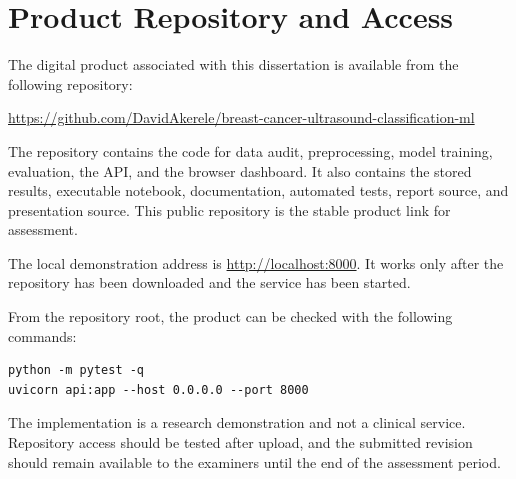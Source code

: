 \chapter{Product Repository and Access}
\label{app:product_repository}

The digital product associated with this dissertation is available from the following repository:

\begin{center}
\large
\url{https://github.com/DavidAkerele/breast-cancer-ultrasound-classification-ml}
\end{center}

The repository contains the code for data audit, preprocessing, model training, evaluation, the API, and the browser dashboard. It also contains the stored results, executable notebook, documentation, automated tests, report source, and presentation source. This public repository is the stable product link for assessment.

The local demonstration address is \url{http://localhost:8000}. It works only after the repository has been downloaded and the service has been started.

From the repository root, the product can be checked with the following commands:

\begin{verbatim}
python -m pytest -q
uvicorn api:app --host 0.0.0.0 --port 8000
\end{verbatim}

The implementation is a research demonstration and not a clinical service. Repository access should be tested after upload, and the submitted revision should remain available to the examiners until the end of the assessment period.
